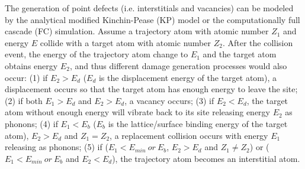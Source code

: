 The generation of point defects (i.e. interstitials and vacancies) can be modeled by the analytical modified Kinchin-Pease (KP) model\cite{Kinchin:1955,Norgett:1975} or the computationally full cascade (FC) simulation.
Assume a trajectory atom with atomic number $Z_1$ and energy $E$ collide with a target atom with atomic number $Z_2$. After the collision event, the energy of the trajectory atom change to $E_1$ and the target atom obtains energy $E_2$, and thus different damage generation processes would also occur: (1) if $E_2 > E_d$ ($E_d$ is the displacement energy of the target atom), a displacement occurs so that the target atom has enough energy to leave the site; (2) if both $E_1 > E_d$ and $E_2 > E_d$, a vacancy occurs; (3) if $E_2 < E_d$, the target atom without enough energy will vibrate back to its site releasing energy $E_2$ as phonons; (4) if $E_1 < E_b$ ($E_b$ is the lattice/surface binding energy of the target atom), $E_2 > E_d$ and $Z_1 = Z_2$, a replacement collision occurs with energy $E_1$ releasing as phonons; (5) if ($E_1 < E_{min}~or~E_b$, $E_2 > E_d$ and $Z_1 \neq Z_2$) or ($E_1 < E_{min}~or~E_b$ and $E_2 < E_d$), the trajectory atom becomes an interstitial atom.

